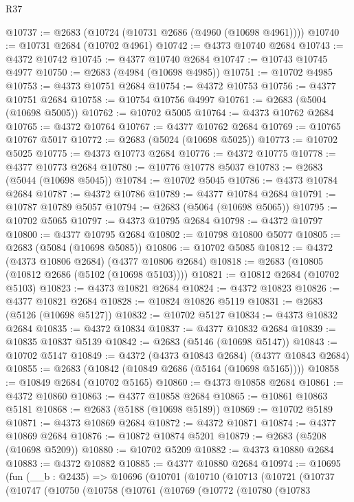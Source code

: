 \begin{lexlean}{R37}
\begin{coremodule}
@10737 := @2683 (@10724 (@10731 @2686 (@4960 (@10698 @4961))))
@10740 := @10731 @2684 (@10702 @4961)
@10742 := @4373 @10740 @2684
@10743 := @4372 @10742
@10745 := @4377 @10740 @2684
@10747 := @10743 @10745 @4977
@10750 := @2683 (@4984 (@10698 @4985))
@10751 := @10702 @4985
@10753 := @4373 @10751 @2684
@10754 := @4372 @10753
@10756 := @4377 @10751 @2684
@10758 := @10754 @10756 @4997
@10761 := @2683 (@5004 (@10698 @5005))
@10762 := @10702 @5005
@10764 := @4373 @10762 @2684
@10765 := @4372 @10764
@10767 := @4377 @10762 @2684
@10769 := @10765 @10767 @5017
@10772 := @2683 (@5024 (@10698 @5025))
@10773 := @10702 @5025
@10775 := @4373 @10773 @2684
@10776 := @4372 @10775
@10778 := @4377 @10773 @2684
@10780 := @10776 @10778 @5037
@10783 := @2683 (@5044 (@10698 @5045))
@10784 := @10702 @5045
@10786 := @4373 @10784 @2684
@10787 := @4372 @10786
@10789 := @4377 @10784 @2684
@10791 := @10787 @10789 @5057
@10794 := @2683 (@5064 (@10698 @5065))
@10795 := @10702 @5065
@10797 := @4373 @10795 @2684
@10798 := @4372 @10797
@10800 := @4377 @10795 @2684
@10802 := @10798 @10800 @5077
@10805 := @2683 (@5084 (@10698 @5085))
@10806 := @10702 @5085
@10812 := @4372 (@4373 @10806 @2684) (@4377 @10806 @2684)
@10818 := @2683 (@10805 (@10812 @2686 (@5102 (@10698 @5103))))
@10821 := @10812 @2684 (@10702 @5103)
@10823 := @4373 @10821 @2684
@10824 := @4372 @10823
@10826 := @4377 @10821 @2684
@10828 := @10824 @10826 @5119
@10831 := @2683 (@5126 (@10698 @5127))
@10832 := @10702 @5127
@10834 := @4373 @10832 @2684
@10835 := @4372 @10834
@10837 := @4377 @10832 @2684
@10839 := @10835 @10837 @5139
@10842 := @2683 (@5146 (@10698 @5147))
@10843 := @10702 @5147
@10849 := @4372 (@4373 @10843 @2684) (@4377 @10843 @2684)
@10855 := @2683 (@10842 (@10849 @2686 (@5164 (@10698 @5165))))
@10858 := @10849 @2684 (@10702 @5165)
@10860 := @4373 @10858 @2684
@10861 := @4372 @10860
@10863 := @4377 @10858 @2684
@10865 := @10861 @10863 @5181
@10868 := @2683 (@5188 (@10698 @5189))
@10869 := @10702 @5189
@10871 := @4373 @10869 @2684
@10872 := @4372 @10871
@10874 := @4377 @10869 @2684
@10876 := @10872 @10874 @5201
@10879 := @2683 (@5208 (@10698 @5209))
@10880 := @10702 @5209
@10882 := @4373 @10880 @2684
@10883 := @4372 @10882
@10885 := @4377 @10880 @2684
@10974 := @10695
    (fun (__b : @2435) =>
    @10696
      (@10701
        (@10710
          (@10713
            (@10721
              (@10737
                (@10747
                  (@10750
                    (@10758
                      (@10761
                        (@10769
                          (@10772
                            (@10780
                              (@10783

\end{coremodule}
\end{lexlean}

